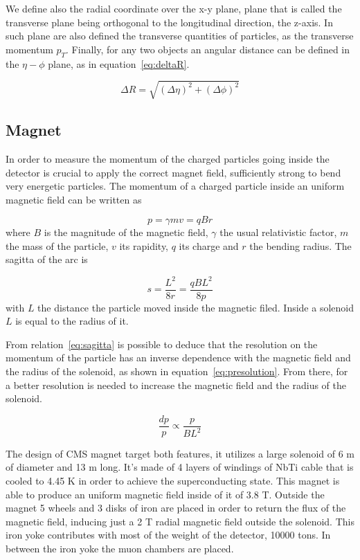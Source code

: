 We define also the radial coordinate over the x-y plane, plane that is called the transverse plane being orthogonal to the longitudinal direction, the z-axis. In such plane are also defined the transverse quantities of particles, as the transverse momentum $p_{T}$. Finally, for any two objects an angular distance can be defined in the $\eta-\phi$ plane, as in equation~\ref{eq:deltaR}.

\begin{equation}
  \label{eq:deltaR}
  \Delta R=\sqrt{(\Delta\eta)^{2}+(\Delta\phi)^{2}}
\end{equation}

\subsection{Magnet}
\label{sec:magnet}

In order to measure the momentum of the charged particles going inside the detector is crucial to apply the correct magnet field, sufficiently strong to bend very energetic particles. The momentum of a charged particle inside an uniform magnetic field can be written as

\begin{equation}
  \label{eq:momB}
  p=\gamma m v=qBr
\end{equation} where $B$ is the magnitude of the magnetic field, $\gamma$ the usual relativistic factor, $m$ the mass of the particle, $v$ its rapidity, $q$ its charge and $r$ the bending radius. The sagitta of the arc is

\begin{equation}
  \label{eq:sagitta}
  s=\frac{L^{2}}{8r}=\frac{qBL^{2}}{8p}
\end{equation} with $L$ the distance the particle moved inside the magnetic filed. Inside a solenoid $L$ is equal to the radius of it. 

From relation~\ref{eq:sagitta} is possible to deduce that the resolution on the momentum of the particle has an inverse dependence with the magnetic field and the radius of the solenoid, as shown in equation~\ref{eq:presolution}. From there, for a better resolution is needed to increase the magnetic field and the radius of the solenoid. 

\begin{equation}
  \label{eq:presolution}
  \frac{dp}{p}\propto \frac{p}{BL^{2}}
\end{equation}

The design of CMS magnet target both features, it utilizes a large solenoid of 6 m of diameter and 13 m long. It's made of 4 layers of windings of NbTi cable that is cooled to 4.45 K in order to achieve the superconducting state. This magnet is able to produce an uniform magnetic field inside of it of 3.8 T. Outside the magnet 5 wheels and 3 disks of iron are placed in order to return the flux of the magnetic field, inducing just a 2 T radial magnetic field outside the solenoid. This iron yoke contributes with most of the weight of the detector, 10000 tons. In between the iron yoke the muon chambers are placed.  

